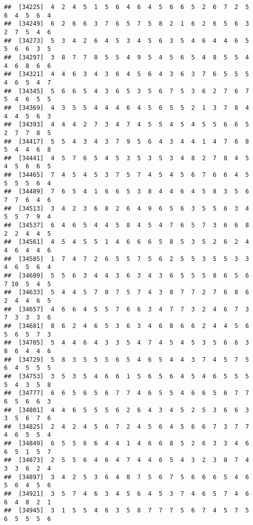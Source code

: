 \documentclass[
]{book}
\begin{document}
\begin{verbatim}
##  [34225]  4  2  4  5  1  5  6  4  6  4  5  6  6  5  2  6  7  2  5  6  4  5  6  4
##  [34249]  6  2  6  6  3  7  6  5  7  5  8  2  1  6  2  6  5  6  3  2  7  5  4  6
##  [34273]  5  3  4  2  6  4  5  3  4  5  6  3  5  4  6  4  4  6  5  5  6  6  3  5
##  [34297]  3  8  7  7  8  5  5  4  9  5  4  5  6  5  4  8  5  5  4  4  6  8  6  6
##  [34321]  4  4  6  3  4  3  6  4  5  6  4  3  6  3  7  6  5  5  5  4  6  5  4  7
##  [34345]  5  6  6  5  4  3  6  5  3  5  6  7  5  3  6  2  7  6  7  5  4  6  5  5
##  [34369]  4  3  5  5  4  4  4  6  4  5  6  5  5  2  1  3  7  8  4  4  4  5  6  3
##  [34393]  4  4  4  2  7  3  4  7  4  5  5  4  5  4  5  5  6  6  5  2  7  7  8  5
##  [34417]  5  5  4  3  4  3  7  9  5  6  4  3  4  4  1  4  7  6  8  5  4  4  6  8
##  [34441]  4  5  7  6  5  4  5  3  5  3  5  3  4  8  2  7  8  4  5  4  5  6  6  5
##  [34465]  7  4  5  4  5  3  7  5  7  4  5  4  5  6  7  6  6  4  5  5  5  5  6  4
##  [34489]  7  6  5  4  1  6  6  5  3  8  4  4  6  4  5  8  3  5  6  7  7  6  4  6
##  [34513]  3  4  2  3  6  8  2  6  4  9  6  5  6  3  5  5  6  3  4  5  5  7  9  4
##  [34537]  6  4  6  5  4  4  5  8  4  5  4  7  6  5  7  3  6  6  8  2  2  4  4  5
##  [34561]  4  5  4  5  5  1  4  6  6  6  5  8  5  3  5  2  6  2  4  4  6  4  4  6
##  [34585]  1  7  4  7  2  6  5  5  7  5  6  2  5  5  3  5  5  3  3  4  6  5  6  4
##  [34609]  5  5  6  3  4  4  3  6  3  4  3  6  5  5  5  8  6  5  6  7 10  5  4  5
##  [34633]  5  4  4  5  7  8  7  5  7  4  3  8  7  7  2  7  6  8  6  2  4  4  6  5
##  [34657]  4  6  6  4  5  5  7  6  6  3  4  7  7  3  2  4  6  7  3  7  3  3  3  6
##  [34681]  8  6  2  4  6  5  3  6  3  4  6  8  6  6  2  4  4  5  6  5  6  5  7  3
##  [34705]  5  4  4  6  4  3  3  5  4  7  4  5  4  5  3  5  6  6  3  8  6  4  4  6
##  [34729]  5  8  3  5  5  5  6  5  4  6  5  4  4  3  7  4  5  7  5  6  4  5  5  5
##  [34753]  3  5  3  5  4  6  6  1  5  6  5  6  4  5  4  6  5  5  5  5  4  3  5  8
##  [34777]  6  6  5  6  5  6  7  7  4  6  5  5  4  6  6  5  6  7  7  6  5  6  6  3
##  [34801]  4  4  6  5  5  5  6  2  6  4  3  4  5  2  5  3  6  6  3  3  5  6  7  6
##  [34825]  2  4  2  4  5  6  7  2  4  5  6  4  5  6  6  7  3  7  7  4  6  5  5  4
##  [34849]  6  5  5  6  6  4  4  1  4  6  6  8  5  2  6  3  3  4  6  6  5  1  5  7
##  [34873]  2  5  5  6  4  6  4  7  4  4  6  5  4  3  2  3  8  7  4  3  3  6  2  4
##  [34897]  3  4  2  5  3  6  4  8  7  5  6  7  5  6  6  6  5  4  6  5  6  4  5  6
##  [34921]  3  5  7  4  6  3  4  5  6  4  5  3  7  4  6  5  7  4  6  6  4  8  2  1
##  [34945]  3  1  5  5  4  6  3  5  8  7  7  7  5  6  7  4  5  7  5  6  5  5  5  6

\end{verbatim}
\end{document}
